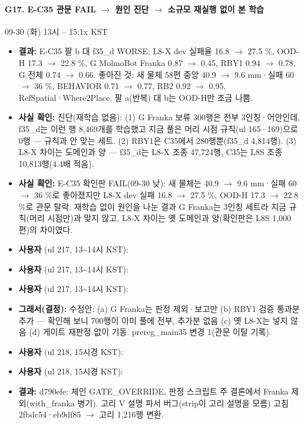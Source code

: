 \paragraph{G17. E-C35 관문 FAIL $\rightarrow$ 원인 진단 $\rightarrow$ 소규모 재실행 없이 본 학습}
{\small 09-30 (화) 13시 -- 15:1x KST}
\begin{itemize}
  \item \textbf{결과:} E-C35 팔 b 대 f35\_d WORSE: L8-X dev 실패율 16.8 $\rightarrow$ 27.5 \%, OOD-H 17.3 $\rightarrow$ 22.8 \%, G MolmoBot Franka 0.87 $\rightarrow$ 0.45, RBY1 0.94 $\rightarrow$ 0.78, G 전체 0.74 $\rightarrow$ 0.66. 좋아진 것: 새 물체 58편 중앙 40.9 $\rightarrow$ 9.6 mm·실패 60 $\rightarrow$ 36 \%, BEHAVIOR 0.71 $\rightarrow$ 0.77, RB2 0.92 $\rightarrow$ 0.95, RefSpatial·Where2Place. 팔 a(반복) 대 b는 OOD-H만 조금 나쁨.
  \item \textbf{사실 확인:} 진단(재학습 없음): (1) G Franka 보류 300행은 전부 3인칭·어안인데, f35\_d는 이런 행 8,469개를 학습했고 지금 풀은 머리 시점 규칙(ul 165·169)으로 0행 --- 규칙과 안 맞는 세트. (2) RBY1은 C35에서 280행뿐(f35\_d 4,814행). (3) L8-X 차이는 도메인과 양 --- f35\_d는 L8-X 조종 47,724행, C35는 L8S 조종 10,813행(4.4배 적음).
  \item \textbf{사실 확인:} E-C35 확인판 FAIL(09-30 낮): 새 물체는 40.9 $\rightarrow$ 9.6 mm·실패 60 $\rightarrow$ 36 \%로 좋아졌지만 L8-X dev 실패 16.8 $\rightarrow$ 27.5 \%, OOD-H 17.3 $\rightarrow$ 22.8 \%로 관문 탈락. 재학습 없이 원인을 나눈 결과 G Franka는 3인칭 세트라 지금 규칙(머리 시점만)과 맞지 않고, L8-X 차이는 옛 도메인과 양(확인판은 L8S 1,000편)의 차이였다.
  \item \textbf{사용자} (ul 217, 13\textasciitilde{}14시 KST): 
  \item \textbf{사용자} (ul 217, 13\textasciitilde{}14시 KST): 
  \item \textbf{사용자} (ul 217, 13\textasciitilde{}14시 KST): 
  \item \textbf{그래서(결정):} 수정안: (a) G Franka는 판정 제외·보고만 (b) RBY1 검증 통과분 추가 --- 확인해 보니 700행이 이미 풀에 전부, 추가분 없음 (c) 옛 L8-X는 넣지 않음 (d) 게이트 재판정 없이 기동. prereg\_main35 변경 1(관문 이탈 기록).
  \item \textbf{사용자} (ul 218, 15시경 KST): 
  \item \textbf{사용자} (ul 218, 15시경 KST): 
  \item \textbf{결과:} d790efe: 체인 GATE\_OVERRIDE, 판정 스크립트 주 결론에서 Franka 제외(with\_franka 병기). 고리 V 설명 파서 버그(strip이 고리 설명을 모름) 고침 2fbdc54·eb9df85 $\rightarrow$ 고리 1,216행 변환.
\end{itemize}

